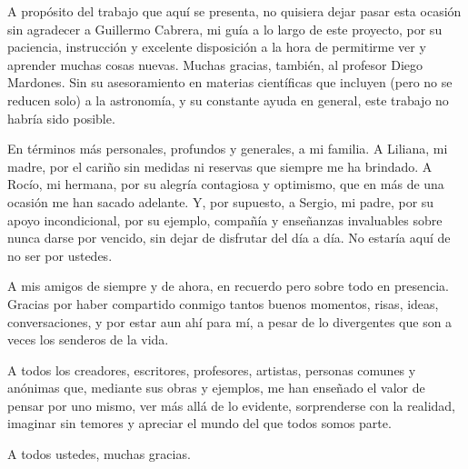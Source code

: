 \documentclass[upright, contnum]{umemoria}
\begin{document}
\begin{thanks}
A propósito del trabajo que aquí se presenta, no quisiera dejar pasar esta ocasión sin agradecer a Guillermo Cabrera, mi guía a lo largo de este proyecto, por su paciencia, instrucción y excelente disposición a la hora de permitirme ver y aprender muchas cosas nuevas. Muchas gracias, también, al profesor Diego Mardones. Sin su asesoramiento en materias científicas que incluyen (pero no se reducen solo) a la astronomía, y su constante ayuda en general, este trabajo no habría sido posible.

En términos más personales, profundos y generales, a mi familia. A Liliana, mi madre, por el cariño sin medidas ni reservas que siempre me ha brindado. A Rocío, mi hermana, por su alegría contagiosa y optimismo, que en más de una ocasión me han sacado adelante. Y, por supuesto, a Sergio, mi padre, por su apoyo incondicional, por su ejemplo, compañía y enseñanzas invaluables sobre nunca darse por vencido, sin dejar de disfrutar del día a día. No estaría aquí de no ser por ustedes.

A mis amigos de siempre y de ahora, en recuerdo pero sobre todo en presencia. Gracias por haber compartido conmigo tantos buenos momentos, risas, ideas, conversaciones, y por estar aun ahí para mí, a pesar de lo divergentes que son a veces los senderos de la vida.

A todos los creadores, escritores, profesores, artistas, personas comunes y anónimas que, mediante sus obras y ejemplos, me han enseñado el valor de pensar por uno mismo, ver más allá de lo evidente, sorprenderse con la realidad, imaginar sin temores y apreciar el mundo del que todos somos parte.

A todos ustedes, muchas gracias.
\end{thanks}

\cleardoublepage
\begin{spacing}{1}
\tableofcontents
\listoffigures
\end{spacing}

\mainmatter








\nocite{*}


\end{document}
